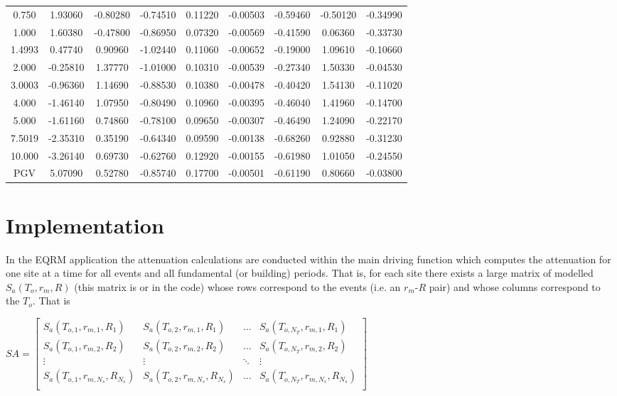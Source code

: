 \begin{table}
\begin{tabular}{ccccccccc}
0.750   & 1.93060  & -0.80280  & -0.74510  & 0.11220   & -0.00503 & -0.59460 & -0.50120 & -0.34990 \\
1.000   & 1.60380  & -0.47800  & -0.86950  & 0.07320   & -0.00569 & -0.41590 & 0.06360  & -0.33730 \\
1.4993  & 0.47740  & 0.90960   & -1.02440  & 0.11060   & -0.00652 & -0.19000 & 1.09610  & -0.10660 \\
2.000   & -0.25810 & 1.37770   & -1.01000  & 0.10310   & -0.00539 & -0.27340 & 1.50330  & -0.04530 \\
3.0003  & -0.96360 & 1.14690   & -0.88530  & 0.10380   & -0.00478 & -0.40420 & 1.54130  & -0.11020 \\
4.000   & -1.46140 & 1.07950   & -0.80490  & 0.10960   & -0.00395 & -0.46040 & 1.41960  & -0.14700 \\
5.000   & -1.61160 & 0.74860   & -0.78100  & 0.09650   & -0.00307 & -0.46490 & 1.24090  & -0.22170 \\
7.5019  & -2.35310 & 0.35190   & -0.64340  & 0.09590   & -0.00138 & -0.68260 & 0.92880  & -0.31230 \\
10.000  & -3.26140 & 0.69730   & -0.62760  & 0.12920   & -0.00155 & -0.61980 & 1.01050  & -0.24550 \\
PGV     & 5.07090  & 0.52780   & -0.85740  & 0.17700   & -0.00501 & -0.61190 & 0.80660  & -0.03800 \\
\hline
\end{tabular}
\end{table}


\normalsize

\section{Implementation}\label{sec:implementation} In the EQRM
application the attenuation calculations are conducted within the
main driving function  which computes the
attenuation for one site at a time for all events and all
fundamental (or building) periods. That is, for each site there
exists a large matrix of modelled $S_a(T_o,r_m,R)$ (this matrix is
 or  in the code) whose rows
correspond to the events (i.e. an $r_m$-$R$ pair) and whose columns
correspond to the $T_o$. That is

\begin{math}
 SA = \left[ \begin{array}{ccccc}
S_a(T_{o,1},r_{m,1},R_1) & S_a(T_{o,2},r_{m,1},R_1) &  \hdots & S_a(T_{o,N_T},r_{m,1},R_1) \\
S_a(T_{o,1},r_{m,2},R_2) & S_a(T_{o,2},r_{m,2},R_2) &  \hdots & S_a(T_{o,N_T},r_{m,2},R_2) \\
\vdots & \vdots &  \ddots & \vdots \\
S_a(T_{o,1},r_{m,N_s},R_{N_s}) & S_a(T_{o,2},r_{m,N_s},R_{N_s}) & \hdots & S_a(T_{o,N_T},r_{m,N_s},R_{N_s}) \\
\end{array} \right]
\end{math}


